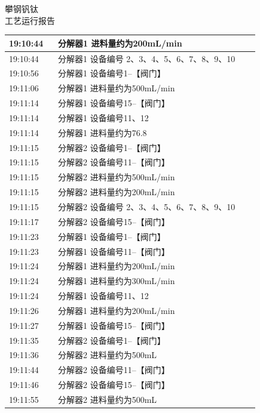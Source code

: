 \documentclass[UTF8,10pt,a4paper,fontset=fandol]{ctexart}
\begin{document}
\hfill
\begin{minipage}[t]{0.48\linewidth}
\centering
{\small 攀钢钒钛}\\[-1mm]
工艺运行报告

\vspace{2mm}
{\scriptsize
\begin{tabular}{|p{0.18\linewidth}|p{0.74\linewidth}|}
\hline
19:10:44 & 分解器1 进料量约为200mL/min \\ \hline
19:10:44 & 分解器1 设备编号 2、3、4、5、6、7、8、9、10 \\ \hline
19:10:56 & 分解器1 设备编号1--【阀门】 \\ \hline
19:11:06 & 分解器1 进料量约为500mL/min \\ \hline
19:11:14 & 分解器1 设备编号15--【阀门】 \\ \hline
19:11:14 & 分解器1 设备编号11、12 \\ \hline
19:11:14 & 分解器1 进料量约为76.8 \\ \hline
19:11:15 & 分解器2 设备编号1--【阀门】 \\ \hline
19:11:15 & 分解器2 设备编号11--【阀门】 \\ \hline
19:11:15 & 分解器2 进料量约为500mL/min \\ \hline
19:11:15 & 分解器2 进料量约为200mL/min \\ \hline
19:11:15 & 分解器2 设备编号 2、3、4、5、6、7、8、9、10 \\ \hline
19:11:17 & 分解器2 设备编号15--【阀门】 \\ \hline
19:11:23 & 分解器1 设备编号1--【阀门】 \\ \hline
19:11:23 & 分解器1 设备编号11--【阀门】 \\ \hline
19:11:24 & 分解器1 进料量约为200mL/min \\ \hline
19:11:24 & 分解器1 进料量约为300mL/min \\ \hline
19:11:24 & 分解器1 设备编号11、12 \\ \hline
19:11:26 & 分解器1 进料量约为200mL/min \\ \hline
19:11:27 & 分解器1 设备编号15--【阀门】 \\ \hline
19:11:35 & 分解器2 设备编号1--【阀门】 \\ \hline
19:11:36 & 分解器2 进料量约为500mL \\ \hline
19:11:44 & 分解器2 设备编号11--【阀门】 \\ \hline
19:11:46 & 分解器2 设备编号15--【阀门】 \\ \hline
19:11:55 & 分解器2 进料量约为500mL \\ \hline
\end{tabular}}
\end{minipage}
\end{document}
